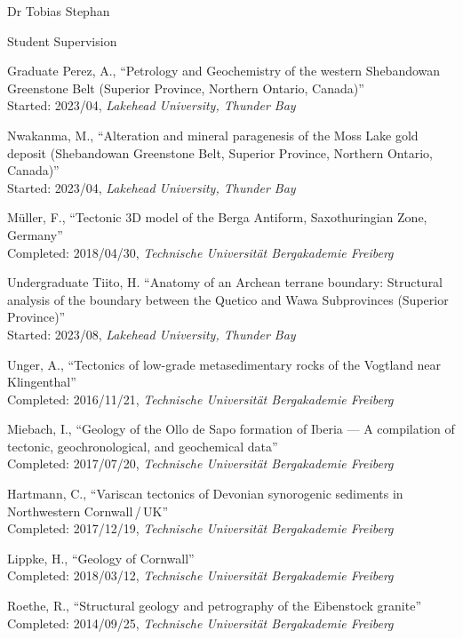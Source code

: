 \documentclass[10pt, paper=letter]{scrartcl} %
\begin{document}
\begin{cv}{Dr Tobias Stephan}
\begin{cvlist}{Student Supervision}
\item[Graduate] Perez, A., \enquote{Petrology and Geochemistry of the western Shebandowan Greenstone Belt (Superior Province, Northern Ontario, Canada)}\\
    Started: 2023/04, \textit{Lakehead University, Thunder Bay}
\item[] Nwakanma, M., \enquote{Alteration and mineral paragenesis of the Moss Lake gold deposit (Shebandowan Greenstone Belt, Superior Province, Northern Ontario, Canada)}\\
    Started: 2023/04, \textit{Lakehead University, Thunder Bay}
\item[] Müller, F., \enquote{Tectonic 3D model of the Berga Antiform, Saxothuringian Zone, Germany}\\
    Completed: 2018/04/30, \textit{Technische Universität Bergakademie Freiberg}
    
\item[Undergraduate] Tiito, H. \enquote{Anatomy of an Archean terrane boundary: Structural analysis of the boundary between the Quetico and Wawa Subprovinces (Superior Province)}\\
Started: 2023/08, \textit{Lakehead University, Thunder Bay}
\item[] Unger, A., \enquote{Tectonics of low-grade metasedimentary rocks of the Vogtland near Kling\-en\-thal}\\
    Completed: 2016/11/21, \textit{Technische Universität Bergakademie Freiberg}
\item[] Miebach, I., \enquote{Geology of the Ollo de Sapo formation of Iberia --- A compilation of tectonic, geochronological, and geochemical data}\\
    Completed: 2017/07/20, \textit{Technische Universität Bergakademie Freiberg}
\item[] Hartmann, C., \enquote{Variscan tectonics of Devonian synorogenic sediments in Northwestern Cornwall\,/\,UK}\\
    Completed: 2017/12/19, \textit{Technische Universität Bergakademie Freiberg}
\item[] Lippke, H., \enquote{Geology of Cornwall}\\
    Completed: 2018/03/12, \textit{Technische Universität Bergakademie Freiberg}
\item[] Roethe, R., \enquote{Structural geology and petrography of the Eibenstock granite}\\
    Completed: 2014/09/25, \textit{Technische Universität Bergakademie Freiberg}
\end{cvlist}


\end{cv}
\end{document}
